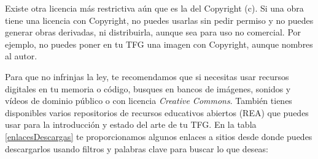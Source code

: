 Existe otra licencia más restrictiva aún que es la del Copyright (c). Si una obra tiene una licencia con Copyright, no puedes usarlas sin pedir permiso y no puedes generar obras derivadas, ni distribuirla, aunque sea para uso no comercial. Por ejemplo, no puedes poner en tu TFG una imagen con Copyright, aunque nombres al autor. 

Para que no infrinjas la ley, te recomendamos que si necesitas usar recursos digitales en tu memoria o código, busques en bancos de imágenes, sonidos y vídeos de dominio público o con licencia \textit{Creative Commons}. También tienes disponibles varios repositorios de recursos educativos abiertos (REA) que puedes usar para la introducción y estado del arte de tu TFG. En la tabla \ref{enlacesDescargas} te proporcionamos algunos enlaces a sitios desde donde puedes descargarlos usando filtros y palabras clave para buscar lo que deseas:

\begin{table}[t]
\begin{center}
\caption{Sitios con recursos digitales libres}
\end{center}
\label{enlacesDescargas}
\end{table}



